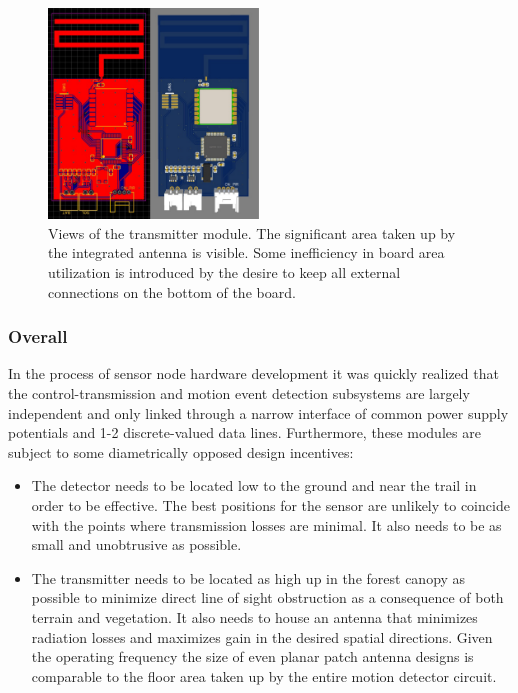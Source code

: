 \documentclass[10pt,nocopyrightspace]{ewsn-proc}
\begin{document}
\begin{figure}[t!]
\centering
\includegraphics[height=2.2in]{./Images/transmitter}
\caption{Views of the transmitter module. The significant area taken up by the integrated antenna is visible. Some inefficiency in board area utilization is introduced by the desire to keep all external connections on the bottom of the board.}
\end{figure}





\subsubsection{Overall}
In the process of sensor node hardware development it was quickly realized that the control-transmission and motion event detection subsystems are largely independent and only linked through a narrow interface of common power supply potentials and 1-2 discrete-valued data lines. Furthermore, these modules are subject to some diametrically opposed design incentives:

\begin{itemize}
\item The detector needs to be located low to the ground and near the trail in order to be effective. The best positions for the sensor are unlikely to coincide with the points where transmission losses are minimal.  It also needs to be as small and unobtrusive as possible.
\item The transmitter needs to be located as high up in the forest canopy as possible to minimize direct line of sight obstruction as a consequence of both terrain and vegetation. It also needs to house an antenna that minimizes radiation losses and maximizes gain in the desired spatial directions. Given the operating frequency the size of even planar patch antenna designs is comparable to the floor area taken up by the entire motion detector circuit.
\end{itemize}
\end{document}
